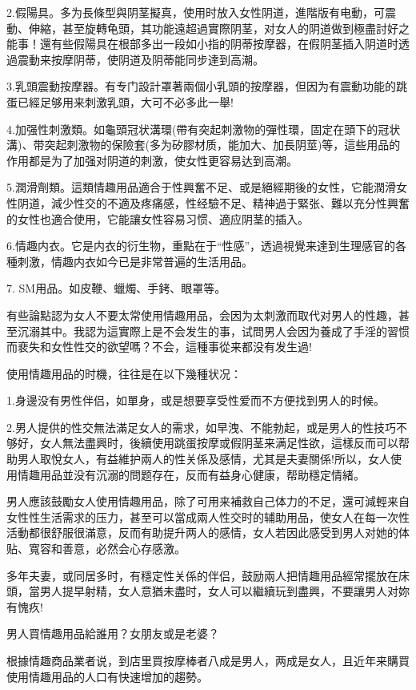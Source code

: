 \documentclass[12pt,UTF8]{ctexbook}
\begin{document}
2.假陽具。多为長條型與阴茎擬真，使用时放入女性阴道，進階版有电動，可震動、伸縮，甚至旋轉龟頭，其功能遠超過實際阴茎，对女人的阴道做到極盡討好之能事！還有些假陽具在根部多出一段如小指的阴蒂按摩器，在假阴茎插入阴道时透過震動来按摩阴蒂，使阴道及阴蒂能同步達到高潮。

3.乳頭震動按摩器。有专门設計罩著兩個小乳頭的按摩器，但因为有震動功能的跳蛋已經足够用来刺激乳頭，大可不必多此一舉!

4.加强性刺激類。如龜頭冠状溝環(帶有突起刺激物的彈性環，固定在頭下的冠状溝)、带突起刺激物的保險套(多为矽膠材质，能加大、加長阴莖)等，這些用品的作用都是为了加强对阴道的刺激，使女性更容易达到高潮。

5.潤滑劑類。這類情趣用品適合于性興奮不足、或是絕經期後的女性，它能潤滑女性阴道，減少性交的不適及疼痛感，性经驗不足、精神過于緊张、難以充分性興奮的女性也適合使用，它能讓女性容易习惯、適应阴茎的插入。

6.情趣内衣。它是内衣的衍生物，重點在于“性感”，透過視覺来達到生理感官的各種刺激，情趣内衣如今已是非常普遍的生活用品。

7. SM用品。如皮鞭、蠟燭、手銬、眼罩等。

有些論點認为女人不要太常使用情趣用品，会因为太刺激而取代对男人的性趣，甚至沉溺其中。我認为這實際上是不会发生的事，试問男人会因为養成了手淫的習惯而裵失和女性性交的欲望嗎？不会，這種事從来都没有发生過!

使用情趣用品的时機，往往是在以下幾種状况：

1.身邊没有男性伴侣，如單身，或是想要享受性爱而不方便找到男人的时候。

2.男人提供的性交無法滿足女人的需求，如早洩、不能勃起，或是男人的性技巧不够好，女人無法盡興时，後續使用跳蛋按摩或假阴茎来满足性欲，這樣反而可以帮助男人取悅女人，有益維护兩人的性关係及感情，尤其是夫妻關係!所以，女人使用情趣用品並没有沉溺的問题存在，反而有益身心健康，帮助穩定情緒。

男人應該鼓勵女人使用情趣用品，除了可用来補救自己体力的不足，還可減輕来自女性性生活需求的压力，甚至可以當成兩人性交时的辅助用品，使女人在每一次性活動都很舒服很滿意，反而有助提升两人的感情，女人若因此感受到男人对她的体贴、寬容和善意，必然会心存感激。

多年夫妻，或同居多时，有穩定性关係的伴侣，鼓励兩人把情趣用品經常擺放在床頭，當男人提早射精，女人意猶未盡时，女人可以繼續玩到盡興，不要讓男人对妳有愧疚!

男人買情趣用品給誰用？女朋友或是老婆？

根據情趣商品業者说，到店里買按摩棒者八成是男人，两成是女人，且近年来購買使用情趣用品的人口有快速增加的趨勢。
\end{document}
